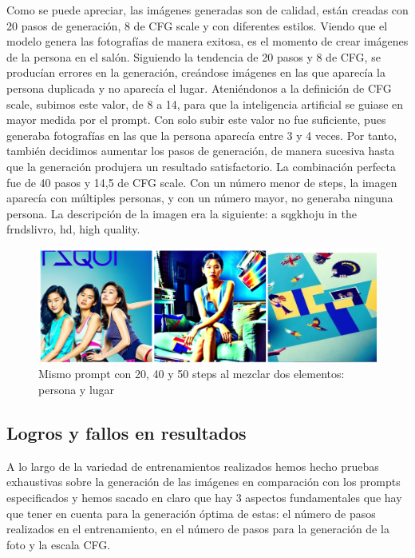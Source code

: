 Como se puede apreciar, las imágenes generadas son de calidad, están creadas con 20 pasos de generación, 8 de CFG scale y con diferentes estilos. Viendo que el modelo genera las fotografías de manera exitosa, es el momento de crear imágenes de la persona en el salón. Siguiendo la tendencia de 20 pasos y 8 de CFG, se producían errores en la generación, creándose imágenes en las que aparecía la persona duplicada y no aparecía el lugar. Ateniéndonos a la definición de CFG scale, subimos este valor, de 8 a 14, para que la inteligencia artificial se guiase en mayor medida por el prompt. Con solo subir este valor no fue suficiente, pues generaba fotografías en las que la persona aparecía entre 3 y 4 veces. Por tanto, también decidimos aumentar los pasos de generación, de manera sucesiva hasta que la generación produjera un resultado satisfactorio. La combinación perfecta fue de 40 pasos y 14,5 de CFG scale. Con un número menor de steps, la imagen aparecía con múltiples personas, y con un número mayor, no generaba ninguna persona. La descripción de la imagen era la siguiente: a sqgkhoju in the frndslivro, hd, high quality.\\

\begin{figure}[!htb]
	\centering
	\includegraphics[width = 1
	\textwidth]{Imagenes/Vectorial/resultadoshojuyfrnds.png}
	\caption{Mismo prompt con 20, 40 y 50 steps al mezclar dos elementos: persona y lugar}
	\label{fig:comphachi}
\end{figure}


\subsection{Logros y fallos en resultados}

A lo largo de la variedad de entrenamientos realizados hemos hecho pruebas exhaustivas sobre la generación de las imágenes en comparación con los prompts especificados y hemos sacado en claro que hay 3 aspectos fundamentales que hay que tener en cuenta para la generación óptima de estas: el número de pasos realizados en el entrenamiento, en el número de pasos para la generación de la foto y la escala CFG. 

